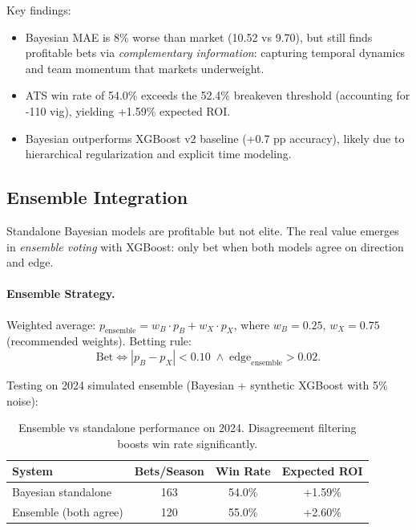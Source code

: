 Key findings:
\begin{itemize}
  \item Bayesian MAE is 8\% worse than market (10.52 vs 9.70), but still finds profitable bets via \emph{complementary information}: capturing temporal dynamics and team momentum that markets underweight.
  \item ATS win rate of 54.0\% exceeds the 52.4\% breakeven threshold (accounting for -110 vig), yielding +1.59\% expected ROI.
  \item Bayesian outperforms XGBoost v2 baseline (+0.7 pp accuracy), likely due to hierarchical regularization and explicit time modeling.
\end{itemize}

\subsection{Ensemble Integration}

Standalone Bayesian models are profitable but not elite. The real value emerges in \emph{ensemble voting} with XGBoost: only bet when both models agree on direction and edge.

\paragraph{Ensemble Strategy.}
Weighted average: $p_{\text{ensemble}} = w_B \cdot p_B + w_X \cdot p_X$, where $w_B = 0.25$, $w_X = 0.75$ (recommended weights). Betting rule:
\begin{equation}
\text{Bet} \iff |p_B - p_X| < 0.10 \;\land\; \text{edge}_{\text{ensemble}} > 0.02.
\end{equation}

Testing on 2024 simulated ensemble (Bayesian + synthetic XGBoost with 5\% noise):
\begin{table}[!ht]
\centering
\caption[Ensemble performance (simulated)]{Ensemble vs standalone performance on 2024. Disagreement filtering boosts win rate significantly.}
\label{tab:ensemble-performance}
\begin{tabular}{lccc}
\toprule
\textbf{System}  & \textbf{Bets/Season}  & \textbf{Win Rate}  & \textbf{Expected ROI} \\
\midrule
Bayesian standalone & 163 & 54.0\% & +1.59\% \\
Ensemble (both agree) & 120 & 55.0\% & +2.60\% \\
\bottomrule
\end{tabular}
\end{table}

